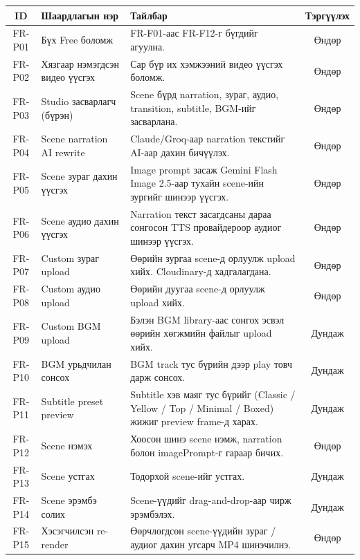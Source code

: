 \begin{longtable}{|c|p{3.2cm}|p{6cm}|c|}
\hline
\textbf{ID} & \textbf{Шаардлагын нэр} & \textbf{Тайлбар} & \textbf{Тэргүүлэх} \\
\hline
\endfirsthead

\endhead


\endfoot

\hline
\endlastfoot

FR-P01 & Бүх Free боломж & FR-F01-аас FR-F12-г бүгдийг агуулна. & Өндөр \\
\hline
FR-P02 & Хязгаар нэмэгдсэн видео үүсгэх & Сар бүр их хэмжээний видео үүсгэх боломж. & Өндөр \\
\hline
FR-P03 & Studio засварлагч (бүрэн) & Scene бүрд narration, зураг, аудио, transition, subtitle, BGM-ийг засварлана. & Өндөр \\
\hline
FR-P04 & Scene narration AI rewrite & Claude/Groq-аар narration текстийг AI-аар дахин бичүүлэх. & Өндөр \\
\hline
FR-P05 & Scene зураг дахин үүсгэх & Image prompt засаж Gemini Flash Image 2.5-аар тухайн scene-ийн зургийг шинээр үүсгэх. & Өндөр \\
\hline
FR-P06 & Scene аудио дахин үүсгэх & Narration текст засагдсаны дараа сонгосон TTS провайдероор аудиог шинээр үүсгэх. & Өндөр \\
\hline
FR-P07 & Custom зураг upload & Өөрийн зургаа scene-д орлуулж upload хийх. Cloudinary-д хадгалагдана. & Өндөр \\
\hline
FR-P08 & Custom аудио upload & Өөрийн дуугаа scene-д орлуулж upload хийх. & Өндөр \\
\hline
FR-P09 & Custom BGM upload & Бэлэн BGM library-аас сонгох эсвэл өөрийн хөгжмийн файлыг upload хийх. & Дундаж \\
\hline
FR-P10 & BGM урьдчилан сонсох & BGM track тус бүрийн дээр play товч дарж сонсох. & Дундаж \\
\hline
FR-P11 & Subtitle preset preview & Subtitle хэв маяг тус бүрийг (Classic / Yellow / Top / Minimal / Boxed) жижиг preview frame-д харах. & Дундаж \\
\hline
FR-P12 & Scene нэмэх & Хоосон шинэ scene нэмж, narration болон imagePrompt-г гараар бичих. & Өндөр \\
\hline
FR-P13 & Scene устгах & Тодорхой scene-ийг устгах. & Дундаж \\
\hline
FR-P14 & Scene эрэмбэ солих & Scene-үүдийг drag-and-drop-аар чирж эрэмбэлэх. & Дундаж \\
\hline
FR-P15 & Хэсэгчилсэн re-render & Өөрчлөгдсөн scene-үүдийн зураг / аудиог дахин угсарч MP4 шинэчилнэ. & Өндөр \\

\end{longtable}
